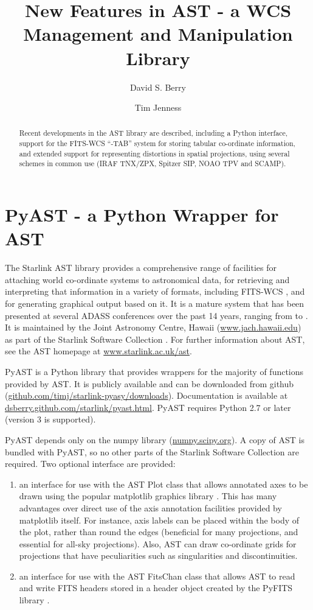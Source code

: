 \documentclass[11pt,twoside]{article}
\begin{document}
\title{New Features in AST - a WCS Management and Manipulation Library}
\author{David S. Berry}
\author{Tim Jenness}

\begin{abstract}
Recent developments in the AST library are described, including a Python
interface, support for the FITS-WCS ``-TAB'' system for storing tabular
co-ordinate information, and extended support for representing
distortions in spatial projections, using several schemes in common use
(IRAF TNX/ZPX, Spitzer SIP, NOAO TPV and SCAMP).
\end{abstract}

\section{PyAST - a Python Wrapper for AST}

The Starlink AST library provides a comprehensive range of facilities for
attaching world co-ordinate systems to astronomical data, for retrieving
and interpreting that information in a variety of formats, including
FITS-WCS \citep{FITSWCS_1999}, and for generating graphical output based
on it. It is a mature system that has been presented at several ADASS
conferences over the past 14 years, ranging from \citet{AST_1998} to
\citet{AST_2009}. It is maintained by the Joint Astronomy Centre, Hawaii
(\url{www.jach.hawaii.edu}) as part of the Starlink Software Collection
\citep{SSC}. For further information about AST, see the AST homepage at
\url{www.starlink.ac.uk/ast}.

PyAST is a Python library that provides wrappers for the majority of
functions provided by AST. It is publicly available and can be downloaded
from github (\url{github.com/timj/starlink-pyasy/downloads}).
Documentation is available at \url{dsberry.github.com/starlink/pyast.html}.
PyAST requires Python 2.7 or later (version 3 is supported).

PyAST depends only on the numpy library (\url{numpy.scipy.org}). A copy
of AST is bundled with PyAST, so no other parts of the Starlink Software
Collection are required. Two optional interface are provided:

\begin{enumerate}

\item an interface for use with the AST Plot class that allows annotated axes
to be drawn using the popular matplotlib graphics library
\citep{MATPLOTLIB}. This has many
advantages over direct use of the axis annotation facilities provided by
matplotlib itself. For instance, axis labels can be placed within the
body of the plot, rather than round the edges (beneficial for many
projections, and essential for all-sky projections). Also, AST can draw
co-ordinate grids for projections that have peculiarities such as
singularities and discontinuities.

\item an interface for use with the AST FitsChan class that allows AST
to read and write FITS headers stored in a header object created by the
PyFITS library \citep{PYFITS_1999}.
\end{enumerate}
\end{document}
